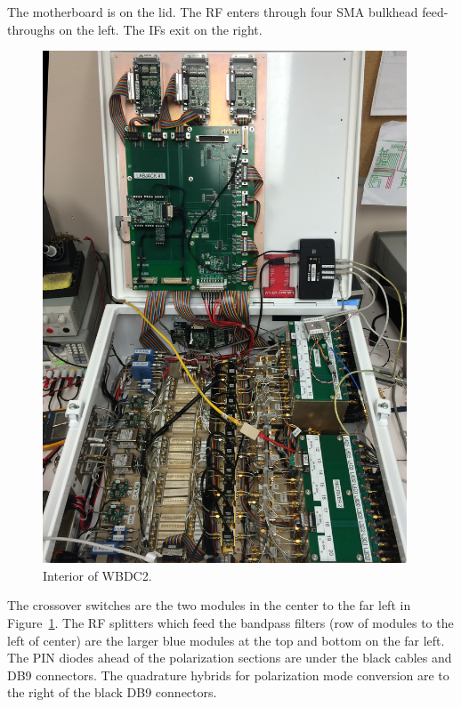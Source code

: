 \documentclass[letterpaper,11pt]{book}
\begin{document}
The motherboard is  on the lid.   The RF enters through four SMA bulkhead 
feed-throughs on the left.  The IFs exit on the right.
\begin{figure}[h!tb]
  \begin{center}
    \includegraphics[height=6in]{interior-half.png}
  \end{center}
  \caption{\label{fig:insideWBDC2}Interior of WBDC2.}
\end{figure}
The crossover switches are the two modules in the
center to the far left in Figure~\ref{fig:insideWBDC2}.
The RF splitters which feed the bandpass filters (row of modules 
to the left of center) are the
larger blue modules at the top and bottom on the far left. 
The PIN diodes ahead of the polarization sections are under the black cables 
and DB9 connectors.
The quadrature hybrids for polarization mode conversion are to the right of the
black DB9 connectors.
\end{document}
